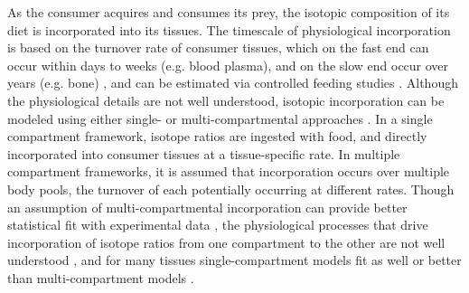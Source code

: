 \documentclass{article}
\begin{document}
As the consumer acquires and consumes its prey, the isotopic composition of its diet is incorporated into its tissues.
The timescale of physiological incorporation is based on the turnover rate of consumer tissues, which on the fast end can occur within days to weeks (e.g. blood plasma), and on the slow end occur over years (e.g. bone) \citep{Tieszen:1983ij}, and can be estimated via controlled feeding studies \citep{Kurle:2009ch,Bearhop:2010db,Kim:2012kc}. %
Although the physiological details are not well understood, isotopic incorporation can be modeled using either single- or multi-compartmental approaches \citep{Cerling:2006kv,delRio:2008bs}.
In a single compartment framework, isotope ratios are ingested with food, and directly incorporated into consumer tissues at a tissue-specific rate.
In multiple compartment frameworks, it is assumed that incorporation occurs over multiple body pools, the turnover of each potentially occurring at different rates.
Though an assumption of multi-compartmental incorporation can provide better statistical fit with experimental data \citep{Cerling:2006kv,Kurle:2009ch,Carleton:2008cq}, the physiological processes that drive incorporation of isotope ratios from one compartment to the other are not well understood \citep{delRio:2008bs}, and for many tissues single-compartment models fit as well or better than multi-compartment models \citep{Kurle:2009ch}.
\end{document}
